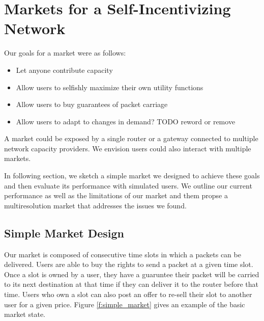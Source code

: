 \newlength{\slotwidth}
\setlength{\slotwidth}{.103\textwidth}

\section{Markets for a Self-Incentivizing Network}
\label{sec:designs}
Our goals for a market were as follows:
\begin{itemize}
\item Let anyone contribute capacity
\item Allow users to selfishly maximize their own utility functions
\item Allow users to buy guarantees of packet carriage
\item Allow users to adapt to changes in demand? TODO reword or remove
\end{itemize}
A market could be exposed by a single router or a gateway connected to multiple network capacity providers.
We envision users could also interact with multiple markets.

In following section, we sketch a simple market we designed to achieve these goals and then evaluate its performance with simulated users.
We outline our current performance as well as the limitations of our market and them propse a multiresolution market that addresses the issues we found.

\subsection{Simple Market Design}
Our market is composed of consecutive time slots in which a packets can be delivered. Users are able to buy the rights to send a packet at a given time slot.
Once a slot is owned by a user, they have a guaruntee their packet will be carried to its next destination at that time if they can deliver it to the router before that time. Users who own a slot can also post an offer to re-sell their slot to another user for a given price.
Figure \ref{f:simple_market} gives an example of the basic market state.

